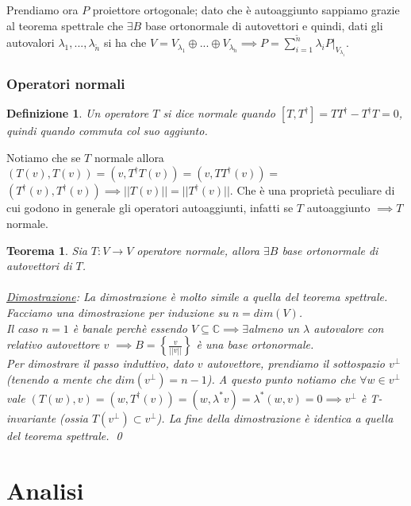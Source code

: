 \documentclass[a4paper,12pt]{report}
\newtheorem{teorema}{Teorema}[chapter]
\newtheorem{definizione}{Definizione}[chapter]
\begin{document}
Prendiamo ora $P$ proiettore ortogonale; dato che è autoaggiunto sappiamo grazie al teorema spettrale che $\exists B$ base ortonormale di autovettori e quindi, dati gli autovalori $\lambda_1,...,\lambda_{\widetilde n}$ si ha che $V=V_{\lambda_1} \oplus...\oplus V_{\lambda_{\widetilde n}} \implies P=\displaystyle\sum_{i=1}^{\widetilde n}\lambda _iP|_{V_{\lambda_i}}$. 

\subsubsection{Operatori normali}
\begin{definizione}
    Un operatore $T$ si dice normale quando $[T,T^\dagger]=TT^\dagger -T^\dagger T=0$, quindi quando commuta col suo aggiunto.
\end{definizione}

Notiamo che se $T$ normale allora $(T(v),T(v))=(v,T^\dagger T(v))=(v,TT^\dagger (v))=$ 
\\$(T^\dagger(v),T^\dagger (v))
\implies||T(v)||=||T^\dagger(v)||$. Che è una proprietà peculiare di cui godono in generale gli operatori autoaggiunti, infatti se $T$ autoaggiunto $\implies T$ normale.

\begin{teorema}
    Sia $T:V\to V$ operatore normale, allora $\exists B$ base ortonormale di autovettori di $T$.
    \\
    \\ \underline{Dimostrazione}: La dimostrazione è molto simile a quella del teorema spettrale. Facciamo una dimostrazione per induzione su $n=dim(V)$. 
    \\Il caso $n=1$ è banale perchè essendo $V \subseteq \mathbb{C} \implies \exists$almeno un $\lambda$ autovalore con relativo autovettore $v$ $\implies B=\displaystyle \left\{ \frac{v}{||v||}\right\}$ è una base ortonormale. 
    \\ Per dimostrare il passo induttivo, dato $v$ autovettore, prendiamo il sottospazio $v^\perp$ (tenendo a mente che $dim(v^\perp)=n-1$). A questo punto notiamo che $\forall w\in v^\perp$ vale $(T(w),v)=(w,T^\dagger(v))=(w,\lambda^*v)=\lambda^*(w,v)=0\implies v^\perp$ è T-invariante (ossia $T(v^\perp) \subset v^\perp $). La fine della dimostrazione è identica a quella del teorema spettrale. \qed
\end{teorema}

\newpage

\section{Analisi}
\end{document}

